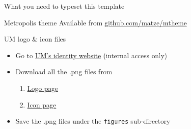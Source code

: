 \documentclass[12pt]{beamer}
\begin{document}
\begin{frame}{{\color{UMYellow} What you need} to typeset this template}

\begin{exampleblock}{Metropolis theme}
Available from \href{https://github.com/matze/mtheme}{\myURL github.com/matze/mtheme}	
\end{exampleblock}

\begin{exampleblock}{UM logo \& icon files}
\begin{itemize}
\item Go to \href{https://identity.co.um.edu.mo/}{\myURL UM's identity website} (internal access only)
\item Download \underline{all the .png} files from
	\begin{enumerate}
	\item \href{https://identity.co.um.edu.mo/university-logo/}{\myURL Logo page}
	\item \href{https://identity.co.um.edu.mo/university-icon/}{\myURL Icon page}
	\end{enumerate}
\item Save the .png files under the {\tt \footnotesize figures} sub-directory 
\end{itemize}
\end{exampleblock}

\end{frame}


{
\begin{frame}

 \color{UMYellow}{\bf\Large UMBlue as background color}

\end{frame}
}



{
}
\end{document}
